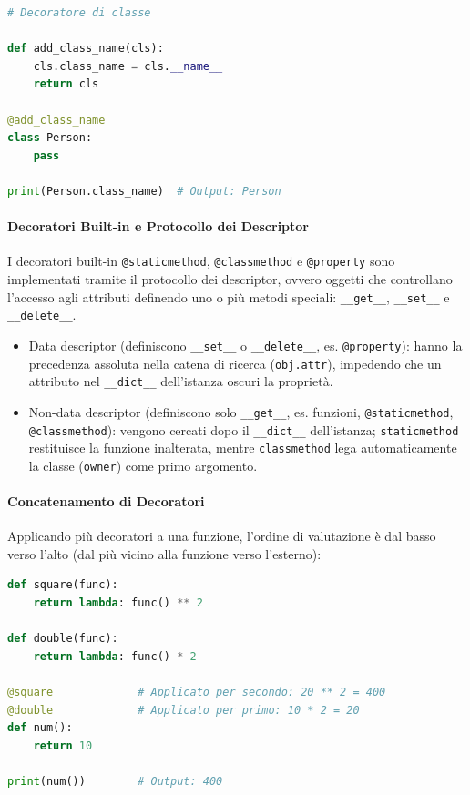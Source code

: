 \documentclass[12pt]{extarticle}
\begin{document}
\begin{lstlisting}[language=Python]
# Decoratore di classe

def add_class_name(cls):
    cls.class_name = cls.__name__
    return cls

@add_class_name
class Person:
    pass

print(Person.class_name)  # Output: Person
\end{lstlisting}

\paragraph{Decoratori Built-in e Protocollo dei Descriptor}
I decoratori built-in \texttt{@staticmethod}, \texttt{@classmethod} e \texttt{@property} sono implementati tramite il protocollo dei descriptor, ovvero oggetti che controllano l'accesso agli attributi definendo uno o più metodi speciali: \texttt{\_\_get\_\_}, \texttt{\_\_set\_\_} e \texttt{\_\_delete\_\_}.

\begin{itemize}
\item Data descriptor (definiscono \texttt{\_\_set\_\_} o \texttt{\_\_delete\_\_}, es. \texttt{@property}): hanno la precedenza assoluta nella catena di ricerca (\texttt{obj.attr}), impedendo che un attributo nel \texttt{\_\_dict\_\_} dell'istanza oscuri la proprietà.
\item Non-data descriptor (definiscono solo \texttt{\_\_get\_\_}, es. funzioni, \texttt{@staticmethod}, \texttt{@classmethod}): vengono cercati dopo il \texttt{\_\_dict\_\_} dell'istanza; \texttt{staticmethod} restituisce la funzione inalterata, mentre \texttt{classmethod} lega automaticamente la classe (\texttt{owner}) come primo argomento.
\end{itemize}

\paragraph{Concatenamento di Decoratori}
Applicando più decoratori a una funzione, l'ordine di valutazione è dal basso verso l'alto (dal più vicino alla funzione verso l'esterno):

\begin{lstlisting}[language=Python]
def square(func):
    return lambda: func() ** 2

def double(func):
    return lambda: func() * 2

@square             # Applicato per secondo: 20 ** 2 = 400
@double             # Applicato per primo: 10 * 2 = 20
def num():
    return 10

print(num())        # Output: 400
\end{lstlisting}
\end{document}
